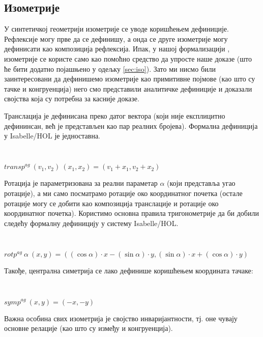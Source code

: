 \documentclass[a4paper, 12pt]{article}
\newcommand{\agtransp}[2]{\ensuremath{transp^{ag}\ #1\ #2}}
\newcommand{\agrotp}[2]{\ensuremath{rotp^{ag}\ #1\ #2}}
\newcommand{\agsymp}[1]{\ensuremath{symp^{ag}\ #1}}
\begin{document}
\subsection{Изометрије}

У синтетичкој геометрији изометрије се уводе коришћењем
дефиниције. Рефлексије могу прве да се дефинишу, а онда се друге
изометрије могу дефинисати као композиција рефлексија. Ипак, у нашој
формализацији , изометрије се користе само као помоћно средство да
упросте наше доказе (што ће бити додатно појашњено у одељку
\ref{sec:iso}). Зато ми нисмо били заинтересовани да дефинишемо
изометрије као примитивне појмове (као што су тачке и конгруенција)
него смо представили аналитичке дефиниције и доказали својства која су
потребна за касније доказе.

Транслација је дефинисана преко датог вектора (који није експлицитно
дефининсан, већ је представљен као пар реалних бројева). Формална
дефиниција у Isabelle/HOL је једноставна.

{\tt
\begin{tabbing}
$\agtransp{(v_1, v_2)}{(x_1, x_2)} = (v_1 + x_1, v_2 + x_2)$
\end{tabbing}
}

Ротација је параметризована за реални параметар $\alpha$ (који
представља угао ротације), а ми само посматрамо ротације око
координатног почетка (остале ротације могу се добити као композиција
транслације и ротације око координатног почетка).  Користимо основна
правила тригонометрије да би добили следећу формалну дефиницију у
систему Isabelle/HOL.

{\tt
\begin{tabbing}
$\agrotp{\alpha}{(x, y)} = ((\cos \alpha)\cdot x - (\sin
\alpha)\cdot y , (\sin \alpha)\cdot x + (\cos \alpha)\cdot y)$
\end{tabbing}
}

Такође, централна симетрија се лако дефинише коришћењем координата
тачаке:
 {\tt
\begin{tabbing}
$\agsymp{(x, y)} = (-x, -y)$
\end{tabbing}
}

Важна особина свих изометрија је својство инваријантности, тј.  оне
чувају основне релације (као што су између и конгруенција).
\end{document}
